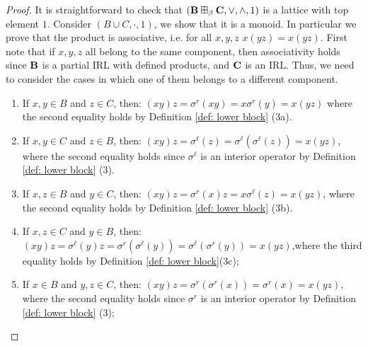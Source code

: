 \documentclass{amsart}
\theoremstyle{definition}
\numberwithin{equation}{section}
\newcommand{\alg}[1]{{\textbf{\upshape #1}}}  %
\newcommand{\sell}{\sigma^\ell}
\newcommand{\sr}{\sigma^r}
\begin{document}
	\begin{proof}
		It is straightforward to check that $(\alg B \boxplus_\beta \alg C, \lor, \land, 1)$ is a lattice with top element $1$. Consider $(B \cup C, \cdot, 1)$, we show that it is a monoid. In particular we prove that the product is associative, i.e. for all $x, y, z$ $x(yz)=x(yz)$. First note that if $x,y,z$ all belong  to the same component, then associativity holds since $\alg B$ is a partial IRL with defined products, and $\alg C$ is an IRL. Thus, we need to consider the cases in which one of them belongs to a different component.
		\begin{enumerate}
			\item If $x,y \in B$ and $z \in C$, then:  $(xy)z=\sr(xy)=x\sr(y)=x(yz)$ where the second equality holds by Definition \ref{def: lower block} (3a). 
				
			\item If $x,y \in C$ and $z \in B$, then: 
			$(xy)z=\sell(z)=\sell(\sell(z))=x(yz)$, where the second equality holds since $\sell$ is an interior operator by Definition \ref{def: lower block} (3). 				
			\item If $x,z \in B$ and $y \in C$, then: 
			 $(xy)z=\sr(x)z=x\sell(z)=x(yz)$, where the second equality holds by Definition \ref{def: lower block} (3b). 
				
			\item If $x,z \in C$ and $y \in B$, then: 
			 $(xy)z=\sell(y)z=\sr(\sell(y))=\sell(\sr(y))=x(yz)$,where the third equality holds by Definition \ref{def: lower block}(3c); 
				
				\item If $x \in B$ and $y,z \in C$, then: 
				 $(xy)z=\sr(\sr(x))=\sr(x)=x(yz)$, where the second equality holds since $\sr$ is an interior operator by Definition \ref{def: lower block} (3); 
					

\end{enumerate}
\end{proof}
\end{document}
